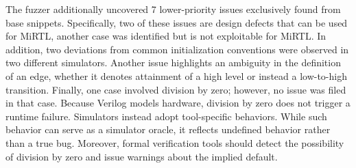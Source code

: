 The fuzzer additionally uncovered 7 lower-priority issues exclusively found from base snippets.
Specifically, two of these issues are design defects that can be used for MiRTL, another case was identified but is not exploitable for MiRTL.
In addition, two deviations from common initialization conventions were observed in two different simulators.
Another issue highlights an ambiguity in the definition of an edge, whether it denotes attainment of a high level or instead a low-to-high transition.
Finally, one case involved division by zero; however, no issue was filed in that case.
Because Verilog models hardware, division by zero does not trigger a runtime failure.
Simulators instead adopt tool-specific behaviors.
While such behavior can serve as a simulator oracle, it reflects undefined behavior rather than a true bug.
Moreover, formal verification tools should detect the possibility of division by zero and issue warnings about the implied default.


